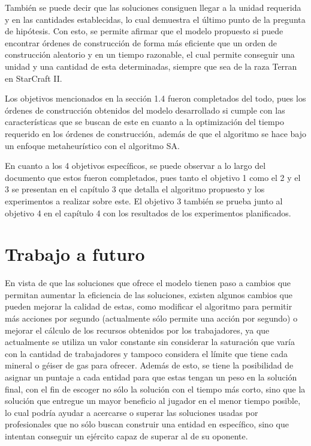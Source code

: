 También se puede decir que las soluciones consiguen llegar a la unidad requerida y en las cantidades establecidas, lo cual demuestra el último punto de la pregunta de hipótesis. Con esto, se permite afirmar que el modelo propuesto si puede encontrar órdenes de construcción de forma más eficiente que un orden de construcción aleatorio y en un tiempo razonable, el cual permite conseguir una unidad y una cantidad de esta determinadas, siempre que sea de la raza Terran en StarCraft II.

Los objetivos mencionados en la sección 1.4 fueron completados del todo, pues los órdenes de construcción obtenidos del modelo desarrollado si cumple con las características que se buscan de este en cuanto a la optimización del tiempo requerido en los órdenes de construcción, además de que el algoritmo se hace bajo un enfoque metaheurístico con el algoritmo SA.

En cuanto a los 4 objetivos específicos, se puede observar a lo largo del documento que estos fueron completados, pues tanto el objetivo 1 como el 2 y el 3 se presentan en el capítulo 3 que detalla el algoritmo propuesto y los experimentos a realizar sobre este. El objetivo 3 también se prueba junto al objetivo 4 en el capítulo 4 con los resultados de los experimentos planificados.

\section{Trabajo a futuro}

En vista de que las soluciones que ofrece el modelo tienen paso a cambios que permitan aumentar la eficiencia de las soluciones, existen algunos cambios que pueden mejorar la calidad de estas, como modificar el algoritmo para permitir más acciones por segundo (actualmente sólo permite una acción por segundo) o mejorar el cálculo de los recursos obtenidos por los trabajadores, ya que actualmente se utiliza un valor constante sin considerar la saturación que varía con la cantidad de trabajadores y tampoco considera el límite que tiene cada mineral o géiser de gas para ofrecer. Además de esto, se tiene la posibilidad de asignar un puntaje a cada entidad para que estas tengan un peso en la solución final, con el fin de escoger no sólo la solución con el tiempo más corto, sino que la solución que entregue un mayor beneficio al jugador en el menor tiempo posible, lo cual podría ayudar a acercarse o superar las soluciones usadas por profesionales que no sólo buscan construir una entidad en específico, sino que intentan conseguir un ejército capaz de superar al de su oponente.

